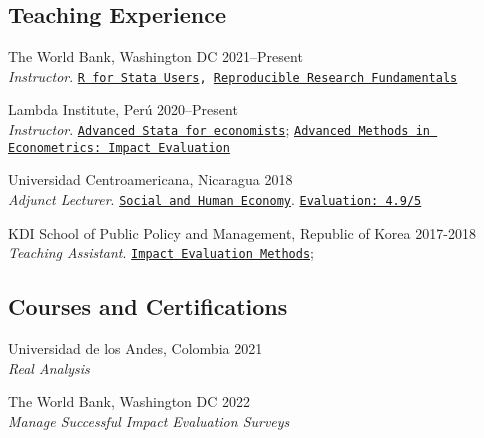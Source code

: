 \documentclass[a4paper, 10pt]{article}
\renewenvironment{itemize}{
  \begin{list}{}
    { \setlength{\itemsep}{5pt}
      \setlength{\parsep}{0pt}
      \setlength{\topsep}{0pt}
      \setlength{\leftmargin}{0em} } }{
  \end{list}}
\begin{document}
\subsection*{Teaching Experience}
\begin{itemize}
  \item The World Bank, Washington DC \hfill 2021--Present \\  {\small \emph{Instructor}.} \texttt{\href{https://github.com/worldbank/dime-r-training}{R for Stata Users}, \href{https://github.com/dime-worldbank/rrf-course}{\texttt{Reproducible Research Fundamentals}}}

  \item Lambda Institute, Perú \hfill 2020--Present \\ {\small \emph{Instructor}.} \texttt{\href{https://github.com/lambda-stata/course-materials}{Advanced Stata for economists}}; \href{https://github.com/lambda-stata/econometria-avanzada}{\texttt{Advanced Methods in Econometrics: Impact Evaluation}}
 
  \item Universidad Centroamericana, Nicaragua \hfill 2018 \\ {\small \emph{Adjunct Lecturer}.} \texttt{\href{https://github.com/econsoc-uca}{Social and Human Economy}}. \texttt{\href{https://rrmaximiliano.github.io/docs/evaluation-esh.pdf}{Evaluation: 4.9/5}}
  
  \item KDI School of Public Policy and Management, Republic of Korea \hfill 2017-2018 \\ {\small \emph{Teaching Assistant}.} \texttt{\href{https://www.dropbox.com/home/teaching_materials/kdischool/spring_2018_impact_evaluation}{Impact Evaluation Methods}}; \texttt{\color{darkblue}{Foundations of Sustainable Development}}
\end{itemize}

\subsection*{Courses and Certifications}
\begin{itemize}
  \item Universidad de los Andes, Colombia \hfill 2021 \\
  {\small \textit{Real Analysis}}
  \item The World Bank, Washington DC \hfill 2022 \\
  {\small \textit{Manage Successful Impact Evaluation Surveys}}
\end{itemize}
\end{document}
